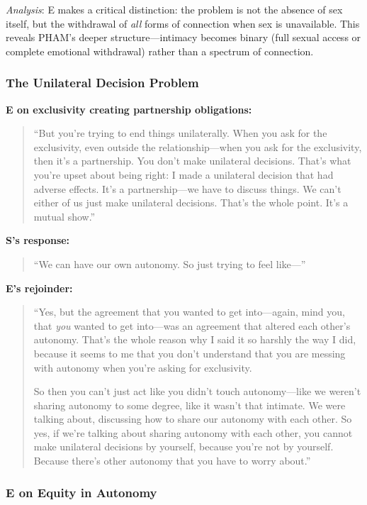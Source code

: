 \documentclass[12pt, letterpaper]{article}
\begin{document}
\textit{Analysis}: E makes a critical distinction: the problem is not the absence of sex itself, but the withdrawal of \textit{all} forms of connection when sex is unavailable. This reveals PHAM's deeper structure---intimacy becomes binary (full sexual access or complete emotional withdrawal) rather than a spectrum of connection.

\subsubsection{The Unilateral Decision Problem}

\textbf{E on exclusivity creating partnership obligations:}
\begin{quote}
``But you're trying to end things unilaterally. When you ask for the exclusivity, even outside the relationship---when you ask for the exclusivity, then it's a partnership. You don't make unilateral decisions. That's what you're upset about being right: I made a unilateral decision that had adverse effects. It's a partnership---we have to discuss things. We can't either of us just make unilateral decisions. That's the whole point. It's a mutual show.''
\end{quote}

\textbf{S's response:}
\begin{quote}
``We can have our own autonomy. So just trying to feel like---''
\end{quote}

\textbf{E's rejoinder:}
\begin{quote}
``Yes, but the agreement that you wanted to get into---again, mind you, that \textit{you} wanted to get into---was an agreement that altered each other's autonomy. That's the whole reason why I said it so harshly the way I did, because it seems to me that you don't understand that you are messing with autonomy when you're asking for exclusivity.

So then you can't just act like you didn't touch autonomy---like we weren't sharing autonomy to some degree, like it wasn't that intimate. We were talking about, discussing how to share our autonomy with each other. So yes, if we're talking about sharing autonomy with each other, you cannot make unilateral decisions by yourself, because you're not by yourself. Because there's other autonomy that you have to worry about.''
\end{quote}

\subsubsection{E on Equity in Autonomy}
\end{document}
